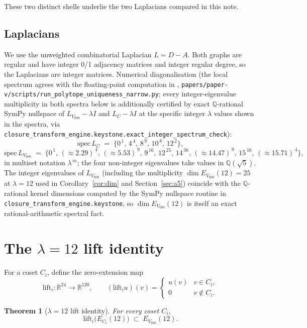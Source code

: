 \documentclass[11pt]{article}
\newcommand{\Vsix}{V_{600}}
\newcommand{\Lsix}{L_{\Vsix}}
\newcommand{\Loc}{L_{C}}
\newcommand{\Esix}{E_{\Vsix}}
\theoremstyle{plain}
\newtheorem{theorem}{Theorem}
\theoremstyle{definition}
\begin{document}
These two distinct shells underlie the two Laplacians compared in
this note.

\subsection{Laplacians}\label{sec:laplacians}

We use the unweighted combinatorial Laplacian $L = D - A$.  Both
graphs are regular and have integer 0/1 adjacency matrices and
integer regular degree, so the Laplacians are integer matrices.
Numerical diagonalisation (the local spectrum agrees with the
floating-point computation in \cite{SmartV},
\texttt{papers/paper-v/scripts/run\_polytope\_uniqueness\_narrow.py};
every integer-eigenvalue multiplicity in both spectra below is
additionally certified by exact $\mathbb{Q}$-rational SymPy
nullspace of $\Lsix - \lambda I$ and $\Loc - \lambda I$ at the
specific integer $\lambda$ values shown in the spectra, via
\texttt{closure\_transform\_engine.keystone.exact\_integer\_spectrum\_check}):
\[
  \mathrm{spec}\,\Loc \;=\; \{0^{\,1},\,4^{\,4},\,8^{\,9},\,10^{\,8},\,12^{\,2}\},
\]
\[
  \mathrm{spec}\,\Lsix \;=\;
   \{0^{\,1},\,(\approx\!2.29)^{\,4},\,(\approx\!5.53)^{\,9},\,9^{\,16},\,
     12^{\,25},\,14^{\,36},\,(\approx\!14.47)^{\,9},\,15^{\,16},\,(\approx\!15.71)^{\,4}\},
\]
in multiset notation $\lambda^{\,m}$; the four non-integer
eigenvalues take values in $\mathbb{Q}(\sqrt 5)$.  The integer
eigenvalues of $\Lsix$ (including the multiplicity
$\dim\Esix(12) = 25$ at $\lambda = 12$ used in
Corollary~\ref{cor:dim} and Section~\ref{sec:a5}) coincide with
the $\mathbb{Q}$-rational kernel dimensions computed by the SymPy
nullspace routine in
\texttt{closure\_transform\_engine.keystone}, so $\dim\Esix(12)$
is itself an exact rational-arithmetic spectral fact.

\section{The $\lambda{=}12$ lift identity}\label{sec:lift}

For a coset $C_i$, define the zero-extension map
\[
  \mathrm{lift}_i\colon \mathbb{R}^{24}\to\mathbb{R}^{120},\qquad
  (\mathrm{lift}_i u)(v) = \begin{cases} u(v) & v\in C_i,\\
                                          0    & v\notin C_i.\end{cases}
\]

\begin{theorem}[$\lambda{=}12$ lift identity]\label{thm:lift}
For every coset $C_i$,
\[
  \mathrm{lift}_i\bigl(E_{C_i}(12)\bigr) \;\subset\; \Esix(12).
\]
\end{theorem}
\end{document}
